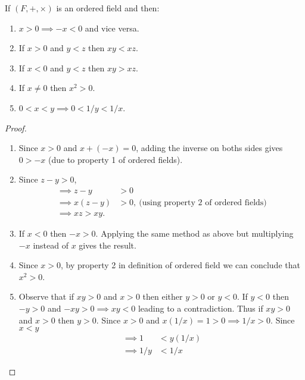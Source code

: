 \begin{proposition}
  If $(F,+,\times)$ is an ordered field and then:
  \begin{enumerate}
    \item $x>0 \implies -x<0$ and vice versa.
    \item If $x>0$ and $y<z$ then $xy<xz$.
    \item If $x<0$ and $y<z$ then $xy>xz$.
    \item If $x\neq 0$ then $x^2 >0$.
    \item $0<x<y\implies 0<1/y<1/x$.
  \end{enumerate}
\end{proposition}
\begin{proof}
  \begin{enumerate}
    \item Since $x>0$ and $x+ (-x) = 0$, adding the inverse on boths sides gives $0>-x$ (due to property 1 of ordered fields).
    \item Since $z-y>0$,
      \begin{align*}
        \implies z-y &> 0\\
        \implies x(z-y) &> 0,\ \text{(using property 2 of ordered fields)}\\
        \implies xz > xy.
      \end{align*}
    \item If $x<0$ then $-x>0$. Applying the same method as above but multiplying $-x$ instead of $x$ gives the result. 
    \item Since $x>0$, by property 2 in definition of ordered field we can conclude that $x^2>0$.
    \item Observe that if $xy>0$ and $x>0$ then either $y>0$ or $y<0$. If $y<0$ then $-y>0$ and $-xy > 0 \implies xy < 0$ leading to a contradiction. Thus if $xy>0$ and $x>0$ then $y>0$. Since $x>0$ and $x(1/x) = 1 > 0 \implies 1/x >0$. Since $x<y$
      \begin{align*}
        \implies 1&< y(1/x)\\
        \implies 1/y &< 1/x
      \end{align*}
  \end{enumerate}
\end{proof}
